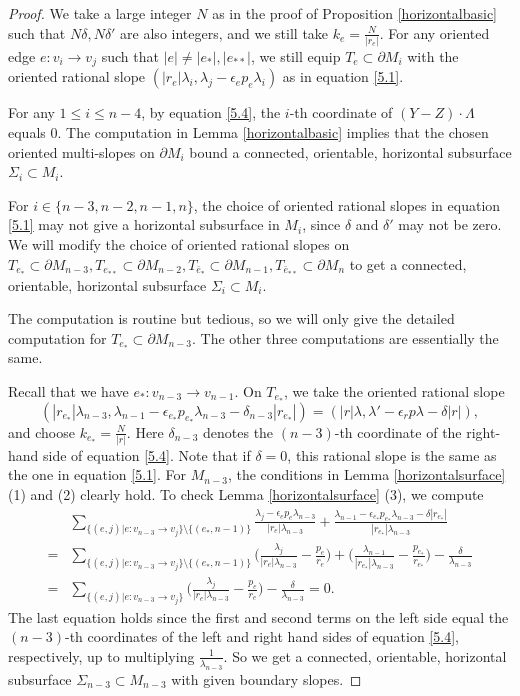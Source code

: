 \documentclass{amsart}
\numberwithin{equation}{section}
\theoremstyle{definition}
\begin{document}
\begin{proof}

We take a large integer $N$ as in the proof of Proposition \ref{horizontalbasic} such that $N\delta, N\delta'$ are also integers, and we still take $k_e=\frac{N}{|r_e|}$. For any oriented edge $e:v_i\to v_j$ such that $|e|\ne |e_*|,|e_{**}|$, we still equip $T_e\subset \partial M_i$ with the oriented rational slope $(|r_e|\lambda_i, \lambda_j-\epsilon_ep_e \lambda_i)$ as in equation \eqref{5.1}. 

For any $1\leq i\leq n-4$, by equation \eqref{5.4}, the $i$-th coordinate of $(Y-Z)\cdot \Lambda$ equals $0$. The computation in Lemma \ref{horizontalbasic} implies that the chosen oriented multi-slopes on $\partial M_i$ bound a connected, orientable, horizontal subsurface $\Sigma_i\subset M_i$.

For $i\in\{n-3,n-2,n-1,n\}$, the choice of oriented rational slopes in equation \eqref{5.1} may not give a horizontal subsurface in $M_i$, since $\delta$ and $\delta'$ may not be zero. We will modify the choice of oriented rational slopes on $T_{e_*}\subset \partial M_{n-3},T_{e_{**}}\subset \partial M_{n-2},T_{\bar{e}_*}\subset \partial M_{n-1},T_{\bar{e}_{**}}\subset \partial M_n$ to get a connected, orientable, horizontal subsurface $\Sigma_i\subset M_i$.

The computation is routine but tedious, so we will only give the detailed computation for $T_{e_*}\subset \partial M_{n-3}$. The other three computations are essentially the same.

Recall that we have $e_*:v_{n-3}\to v_{n-1}$. On $T_{e_*}$, we take the oriented rational slope 
$$(|r_{e_*}|\lambda_{n-3},\lambda_{n-1}-\epsilon_{e_*}p_{e_*}\lambda_{n-3}-\delta_{n-3}|r_{e_*}|)=(|r|\lambda,\lambda'-\epsilon_r p\lambda-\delta|r|),$$
and choose $k_{e_{*}}=\frac{N}{|r|}$.
Here $\delta_{n-3}$ denotes the $(n-3)$-th coordinate of the right-hand side of equation \eqref{5.4}. Note that if $\delta=0$, this rational slope is the same as the one in equation \eqref{5.1}. For $M_{n-3}$, the conditions in Lemma \ref{horizontalsurface} (1) and (2) clearly hold. To check Lemma \ref{horizontalsurface} (3), we compute
\begin{align*}
& \sum_{\{(e,j)|e:v_{n-3}\to v_j\}\setminus \{(e_*,n-1)\}}\frac{\lambda_j-\epsilon_ep_e \lambda_{n-3}}{|r_e|\lambda_{n-3}}+\frac{\lambda_{n-1}-\epsilon_{e_*}p_{e_*}\lambda_{n-3}-\delta|r_{e_*}|}{|r_{e_*}|\lambda_{n-3}}\\
=&\sum_{\{(e,j)|e:v_{n-3}\to v_j\}\setminus \{(e_*,n-1)\}}\Big(\frac{\lambda_j}{|r_e|\lambda_{n-3}}-\frac{p_e}{r_e}\Big)+\Big(\frac{\lambda_{n-1}}{|r_{e_*}|\lambda_{n-3}}-\frac{p_{e_*}}{r_{e_*}}\Big)-\frac{\delta}{\lambda_{n-3}}\\
=&\sum_{\{(e,j)|e:v_{n-3}\to v_j\}}\Big(\frac{\lambda_j}{|r_e|\lambda_{n-3}}-\frac{p_e}{r_e}\Big)-\frac{\delta}{\lambda_{n-3}}=0.
\end{align*}
The last equation holds since the first and second terms on the left side equal the $(n-3)$-th coordinates of the left and right hand sides of equation \eqref{5.4}, respectively, up to multiplying $\frac{1}{\lambda_{n-3}}$. So we get a connected, orientable, horizontal subsurface $\Sigma_{n-3}\subset M_{n-3}$ with given boundary slopes.


\end{proof}
\end{document}
